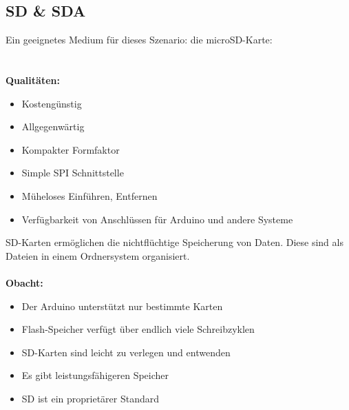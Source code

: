 \documentclass[ngerman]{schoolPres}
\begin{document}
  \subsection{SD \& SDA}%
  \begin{frame}
    Ein geeignetes Medium für dieses Szenario: die microSD-Karte:\\
    \\~\\

    \textbf{Qualitäten:}
    \begin{itemize}
      \item Kostengünstig
      \item Allgegenwärtig
      \item Kompakter Formfaktor
      \item Simple SPI Schnittstelle
      \item Müheloses Einführen, Entfernen
      \item Verfügbarkeit von Anschlüssen für Arduino und andere Systeme
    \end{itemize}


  \end{frame}

  \begin{frame}
    SD-Karten ermöglichen die nichtflüchtige Speicherung von Daten.
    Diese sind als Dateien in einem Ordnersystem organisiert.\\~\\

    \textbf{Obacht:}
    \begin{itemize}
      \item Der Arduino unterstützt nur bestimmte Karten\cite{sd-lib}
      \item Flash-Speicher verfügt über endlich viele Schreibzyklen\cite{zhang2017flash,sd-lifespan}
      \item SD-Karten sind leicht zu verlegen und entwenden
      \item Es gibt leistungsfähigeren Speicher
      \item SD ist ein proprietärer Standard\cite{sd-proprietary}
    \end{itemize}

  \end{frame}
\end{document}
